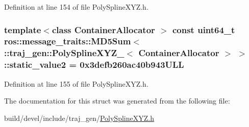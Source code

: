 Definition at line 154 of file Poly\+Spline\+X\+Y\+Z.\+h.

\subsubsection[{\texorpdfstring{static\+\_\+value2}{static_value2}}]{\setlength{\rightskip}{0pt plus 5cm}template$<$class Container\+Allocator $>$ const uint64\+\_\+t ros\+::message\+\_\+traits\+::\+M\+D5\+Sum$<$ \+::{\bf traj\+\_\+gen\+::\+Poly\+Spline\+X\+Y\+Z\+\_\+}$<$ Container\+Allocator $>$ $>$\+::static\+\_\+value2 = 0x3defb260ac40b943\+U\+LL\hspace{0.3cm}{\ttfamily [static]}}\hypertarget{structros_1_1message__traits_1_1_m_d5_sum_3_01_1_1traj__gen_1_1_poly_spline_x_y_z___3_01_container_allocator_01_4_01_4_acf5fc651d4900d74885fff4fc3839676}{}\label{structros_1_1message__traits_1_1_m_d5_sum_3_01_1_1traj__gen_1_1_poly_spline_x_y_z___3_01_container_allocator_01_4_01_4_acf5fc651d4900d74885fff4fc3839676}


Definition at line 155 of file Poly\+Spline\+X\+Y\+Z.\+h.



The documentation for this struct was generated from the following file\+:\begin{DoxyCompactItemize}
\item 
build/devel/include/traj\+\_\+gen/\hyperlink{_poly_spline_x_y_z_8h}{Poly\+Spline\+X\+Y\+Z.\+h}\end{DoxyCompactItemize}
